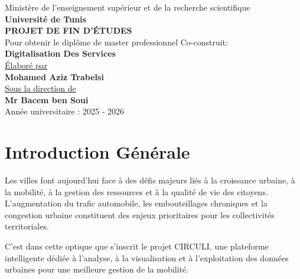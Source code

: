 \documentclass[12pt, a4paper]{report}
\begin{document}
\begin{titlepage}
    \centering
    Ministère de l'enseignement supérieur et de la recherche scientifique\\[0.5cm]
    \textbf{Université de Tunis}\\[1cm]

    \textbf{\Large PROJET DE FIN D'ÉTUDES}\\[0.5cm]
    Pour obtenir le diplôme de master professionnel Co-construit:\\[0.5cm]
    \textbf{\Large Digitalisation Des Services}\\[1cm]

    \uline{Élaboré par}\\[0.3cm]
    \textbf{Mohamed Aziz Trabelsi}\\[1cm]

    \uline{Sous la direction de}\\[0.3cm]
    \textbf{Mr Bacem ben Soui}\\[1cm]

    Année universitaire : 2025 - 2026\\[1cm]
    \vfill
\end{titlepage}

\tableofcontents
\listoffigures
\listoftables



\clearpage
{}

\chapter*{Introduction Générale}

Les villes font aujourd'hui face à des défis majeurs liés à la croissance urbaine, à la mobilité, à la gestion des ressources et à la qualité de vie des citoyens. L'augmentation du trafic automobile, les embouteillages chroniques et la congestion urbaine constituent des enjeux prioritaires pour les collectivités territoriales.

C'est dans cette optique que s'inscrit le projet CIRCULI, une plateforme intelligente dédiée à l'analyse, à la visualisation et à l'exploitation des données urbaines pour une meilleure gestion de la mobilité.
\end{document}
